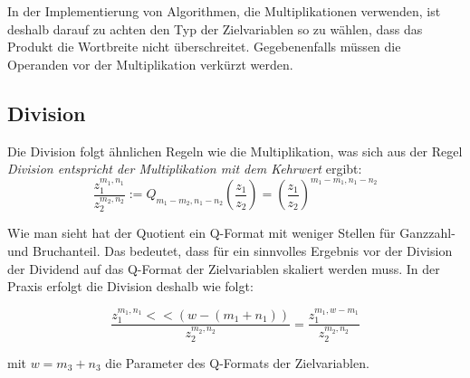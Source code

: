 In der Implementierung von Algorithmen, die Multiplikationen verwenden, ist deshalb darauf zu achten den Typ der Zielvariablen so zu wählen, dass das Produkt die Wortbreite nicht überschreitet. Gegebenenfalls müssen die Operanden vor der Multiplikation verkürzt werden.

\subsection{Division}
Die Division folgt ähnlichen Regeln wie die Multiplikation, was sich aus der Regel \emph{Division entspricht der Multiplikation mit dem Kehrwert} ergibt:
\[\frac{z_1^{m_1,n_1}}{z_2^{m_2,n_2}} := Q_{m_1-m_2,n_1-n_2}\left(\frac{z_1}{z_2}\right) = \left(\frac{z_1}{z_2}\right)^{m_1-m_1,n_1-n_2}\]

Wie man sieht hat der Quotient ein Q-Format mit weniger Stellen für Ganzzahl- und Bruchanteil. Das bedeutet, dass für ein sinnvolles Ergebnis vor der Division der Dividend auf das Q-Format der Zielvariablen skaliert werden muss. In der Praxis erfolgt die Division deshalb wie folgt:

\[\frac{z_1^{m_1,n_1}<<(w-(m_1+n_1))}{z_2^{m_2,n_2}} = \frac{z_1^{m_1,w-m_1}}{z_2^{m_2,n_2}} \]

mit $w=m_3+n_3$ die Parameter des Q-Formats der Zielvariablen.

